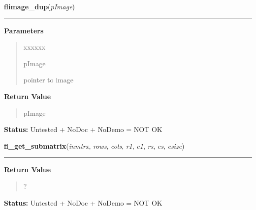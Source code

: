 \hspace{.8\funcindent}\begin{boxedminipage}{\funcwidth}

    \raggedright \textbf{flimage\_dup}(\textit{pImage})

    \vspace{-1.5ex}

    \rule{\textwidth}{0.5\fboxrule}
\setlength{\parskip}{2ex}
\setlength{\parskip}{1ex}
      \textbf{Parameters}
      \vspace{-1ex}

      \begin{quote}
        \begin{Ventry}{xxxxxx}

          \item[pImage]

          pointer to image

        \end{Ventry}

      \end{quote}

      \textbf{Return Value}
    \vspace{-1ex}

      \begin{quote}
      pImage

      \end{quote}

\textbf{Status:} Untested + NoDoc + NoDemo = NOT OK



    \end{boxedminipage}

    \label{xformslib:library:fl_get_submatrix}

    \vspace{0.5ex}

\hspace{.8\funcindent}\begin{boxedminipage}{\funcwidth}

    \raggedright \textbf{fl\_get\_submatrix}(\textit{inmtrx}, \textit{rows}, \textit{cols}, \textit{r1}, \textit{c1}, \textit{rs}, \textit{cs}, \textit{esize})

    \vspace{-1.5ex}

    \rule{\textwidth}{0.5\fboxrule}
\setlength{\parskip}{2ex}
\setlength{\parskip}{1ex}
      \textbf{Return Value}
    \vspace{-1ex}

      \begin{quote}
      ?

      \end{quote}

\textbf{Status:} Untested + NoDoc + NoDemo = NOT OK



    \end{boxedminipage}

